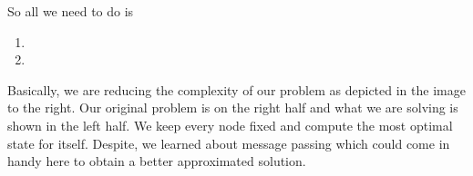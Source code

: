 \begin{minipage}[t]{1\textwidth}
	\begin{minipage}[t]{.48\textwidth}
		So all we need to do is %
		\begin{enumerate}
			\item{}
			\item{}
		\end{enumerate}
		Basically, we are reducing the complexity of our problem as depicted in the image to the right. %
		Our original problem is on the right half and what we are solving is shown in the left half. %
		We keep every node fixed and compute the most optimal state for itself. %
		Despite, we learned about message passing which could come in handy here to obtain a better approximated solution. %
	\end{minipage}
	\hfill
	\begin{minipage}[t]{.48\textwidth}
		\vspace*{.25cm}
		\begin{figure}[H]
			\centering{}
		\end{figure}
	\end{minipage}
\end{minipage}
~\\[.3cm]%
